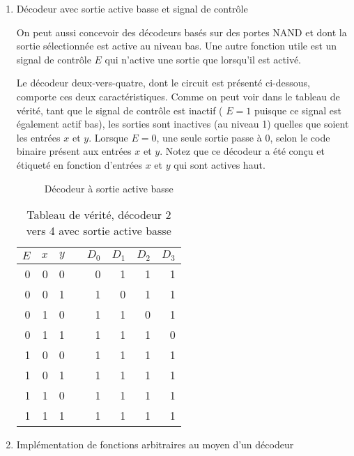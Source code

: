 \documentclass[letter, oneside]{book}
\begin{document}
\begin{enumerate}
\item Décodeur avec sortie active basse et signal de contrôle
\label{sec:orge7c6dd2}

On peut aussi concevoir des décodeurs basés sur des portes NAND et
dont la sortie sélectionnée est active au niveau bas. Une autre
fonction utile est un signal de contrôle \(E\) qui n'active une sortie
que lorsqu'il est activé.

Le décodeur deux-vers-quatre, dont le circuit est présenté ci-dessous,
comporte ces deux caractéristiques. Comme on peut voir dans le tableau
de vérité, tant que le signal de contrôle est inactif ( \(E = 1\)
puisque ce signal est également actif bas), les sorties sont inactives
(au niveau 1) quelles que soient les entrées \(x\) et \(y\). Lorsque
\(E = 0\), une seule sortie passe à 0, selon le code binaire présent
aux entrées \(x\) et \(y\). Notez que ce décodeur a été conçu et
étiqueté en fonction d'entrées \(x\) et \(y\) qui sont actives haut.

\begin{figure}[htbp]
\centering

\caption{\label{fig:org4cc8644}Décodeur à sortie active basse}
\end{figure}


\begin{table}[htbp]
\caption{\label{tab:orgbcfc4e0}Tableau de vérité, décodeur 2 vers 4 avec sortie active basse}
\centering
\begin{tabular}{rrrlrrrr}
\(E\) & \(x\) & \(y\) &  & \(D_0\) & \(D_1\) & \(D_2\) & \(D_3\)\\[0pt]
\hline
0 & 0 & 0 &  & 0 & 1 & 1 & 1\\[0pt]
0 & 0 & 1 &  & 1 & 0 & 1 & 1\\[0pt]
0 & 1 & 0 &  & 1 & 1 & 0 & 1\\[0pt]
0 & 1 & 1 &  & 1 & 1 & 1 & 0\\[0pt]
1 & 0 & 0 &  & 1 & 1 & 1 & 1\\[0pt]
1 & 0 & 1 &  & 1 & 1 & 1 & 1\\[0pt]
1 & 1 & 0 &  & 1 & 1 & 1 & 1\\[0pt]
1 & 1 & 1 &  & 1 & 1 & 1 & 1\\[0pt]
\end{tabular}
\end{table}


\item Implémentation de fonctions arbitraires au moyen d'un décodeur
\label{sec:org46f1df8}


\end{enumerate}
\end{document}
